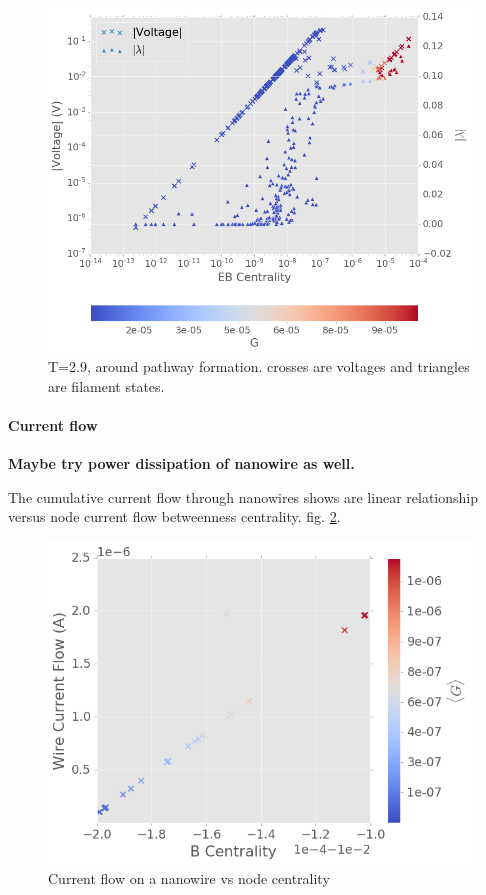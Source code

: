 \documentclass[%
 reprint,
 amsmath,amssymb,
 aps,
]{revtex4-2}
\begin{document}
\begin{figure}[h]
	\centering
	\includegraphics[width=1\linewidth]{figure/v_lam_cent}
	\caption{T=2.9, around pathway formation. crosses are voltages and triangles are filament states.}
	\label{fig:v_lam_cent}
\end{figure}

\paragraph{Current flow}

\textbf{Maybe try power dissipation of nanowire as well.}

The cumulative current flow through nanowires shows are linear relationship versus node current flow betweenness centrality. fig. \ref{fig:i_cent}.

\begin{figure}[h]
	\centering
	\includegraphics[width=1\linewidth]{figure/I_cent}
	\caption{Current flow on a nanowire vs node centrality}
	\label{fig:i_cent}
\end{figure}
\end{document}
